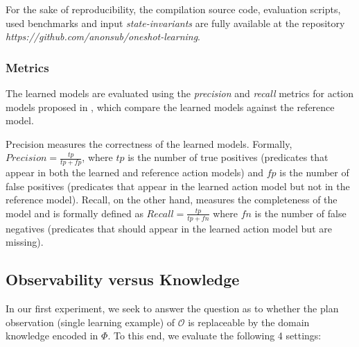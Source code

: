 \documentclass{article}
\begin{document}


For the sake of reproducibility, the compilation source code, evaluation scripts, used benchmarks and input {\em state-invariants} are fully available at the repository {\em https://github.com/anonsub/oneshot-learning}.

\subsubsection{Metrics}
The learned models are evaluated using the {\em precision} and {\em recall} metrics for action models proposed in \cite{aineto2018learning}, which compare the learned models against the reference model.

Precision measures the correctness of the learned models. Formally, $Precision=\frac{tp}{tp+fp}$, where $tp$ is the number of true positives (predicates that appear in both the learned and reference action models) and $fp$ is the number of false positives (predicates that appear in the learned action model but not in the reference model). Recall, on the other hand, measures the completeness of the model and is formally defined as $Recall=\frac{tp}{tp+fn}$ where $fn$ is the number of false negatives (predicates that should appear in the learned action model but are missing).



\subsection{Observability versus Knowledge}
In our first experiment, we seek to answer the question as to whether the plan observation (single learning example) of $\mathcal{O}$ is replaceable by the domain knowledge encoded in $\Phi$. To this end, we evaluate the following 4 settings:
\end{document}
